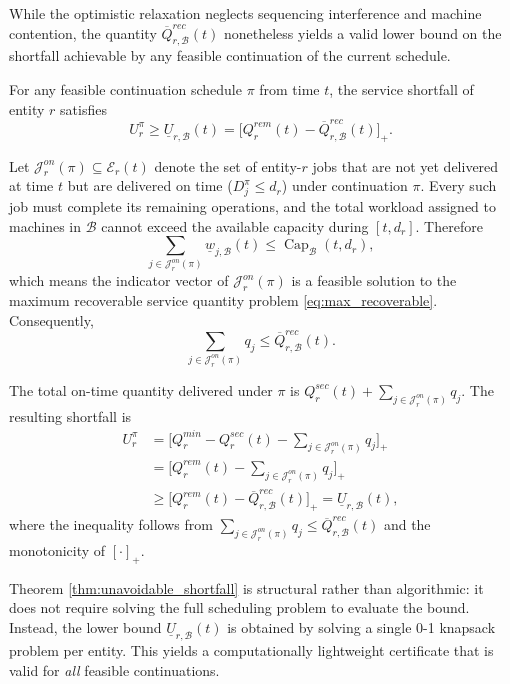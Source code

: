 While the optimistic relaxation neglects sequencing interference and machine contention, the quantity $\overline Q_{r,\mathcal B}^{rec}(t)$ nonetheless yields a valid lower bound on the shortfall achievable by any feasible continuation of the current schedule.

\begin{theorem}\label{thm:unavoidable_shortfall}
For any feasible continuation schedule $\pi$ from time $t$, the service shortfall of entity $r$ satisfies
\begin{equation}\label{eq:shortfall_bound}
U_r^\pi\ge\underline U_{r,\mathcal B}(t)=\big[Q_r^{rem}(t)-\overline Q_{r,\mathcal B}^{rec}(t)\big]_+.
\end{equation}
\end{theorem}

\begin{pf}
Let $\mathcal J_{r}^{on}(\pi)\subseteq\mathcal E_r(t)$ denote the set of entity-$r$ jobs that are not yet delivered at time $t$ but are delivered on time ($D_j^\pi\le d_r$) under continuation $\pi$. Every such job must complete its remaining operations, and the total workload assigned to machines in $\mathcal B$ cannot exceed the available capacity during $[t,d_r]$. Therefore
\[
\sum_{j\in\mathcal J_{r}^{on}(\pi)}\underline w_{j,\mathcal B}(t)\le\operatorname{Cap}_{\mathcal B}(t,d_r),
\]
which means the indicator vector of $\mathcal J_{r}^{on}(\pi)$ is a feasible solution to the maximum recoverable service quantity problem \eqref{eq:max_recoverable}. Consequently,
\[
\sum_{j\in\mathcal J_{r}^{on}(\pi)}q_j\le\overline Q_{r,\mathcal B}^{rec}(t).
\]

The total on-time quantity delivered under $\pi$ is $Q_r^{sec}(t)+\sum_{j\in\mathcal J_{r}^{on}(\pi)}q_j$. The resulting shortfall is
\begin{align}
U_r^\pi&=\big[Q_r^{min}-Q_r^{sec}(t)-\sum_{j\in\mathcal J_{r}^{on}(\pi)}q_j\big]_+\nonumber\\
&=\big[Q_r^{rem}(t)-\sum_{j\in\mathcal J_{r}^{on}(\pi)}q_j\big]_+\nonumber\\
&\ge\big[Q_r^{rem}(t)-\overline Q_{r,\mathcal B}^{rec}(t)\big]_+=\underline U_{r,\mathcal B}(t),\nonumber
\end{align}
where the inequality follows from $\sum_{j\in\mathcal J_{r}^{on}(\pi)}q_j\le\overline Q_{r,\mathcal B}^{rec}(t)$ and the monotonicity of $[\cdot]_+$.
\end{pf}

Theorem \ref{thm:unavoidable_shortfall} is structural rather than algorithmic: it does not require solving the full scheduling problem to evaluate the bound. Instead, the lower bound $\underline U_{r,\mathcal B}(t)$ is obtained by solving a single 0-1 knapsack problem per entity. This yields a computationally lightweight certificate that is valid for \emph{all} feasible continuations.

